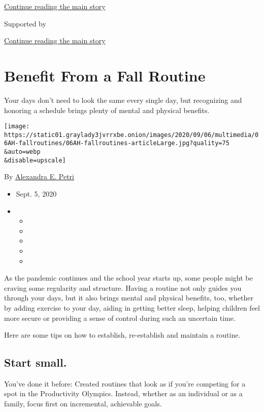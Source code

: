 \protect\hyperlink{after-top}{Continue reading the main story}

Supported by

\protect\hyperlink{after-sponsor}{Continue reading the main story}

\hypertarget{benefit-from-a-fall-routine}{%
\section{Benefit From a Fall
Routine}\label{benefit-from-a-fall-routine}}

Your days don't need to look the same every single day, but recognizing
and honoring a schedule brings plenty of mental and physical benefits.

\texttt{[image: https://static01.graylady3jvrrxbe.onion/images/2020/09/06/multimedia/06AH-fallroutines/06AH-fallroutines-articleLarge.jpg?quality=75\\\&auto=webp\\\&disable=upscale]}

By
\href{https://www.nytimes3xbfgragh.onion/by/alexandra-e--petri}{Alexandra
E. Petri}

\begin{itemize}
\item
  Sept. 5, 2020
\item
  \begin{itemize}
  \item
  \item
  \item
  \item
  \item
  \end{itemize}
\end{itemize}

As the pandemic continues and the school year starts up, some people
might be craving some regularity and structure. Having a routine not
only guides you through your days, but it also brings mental and
physical benefits, too, whether by adding exercise to your day, aiding
in getting better sleep, helping children feel more secure or providing
a sense of control during such an uncertain time.

Here are some tips on how to establish, re-establish and maintain a
routine.

\hypertarget{start-small}{%
\subsection{Start small.}\label{start-small}}

You've done it before: Created routines that look as if you're competing
for a spot in the Productivity Olympics. Instead, whether as an
individual or as a family, focus first on incremental, achievable goals.

